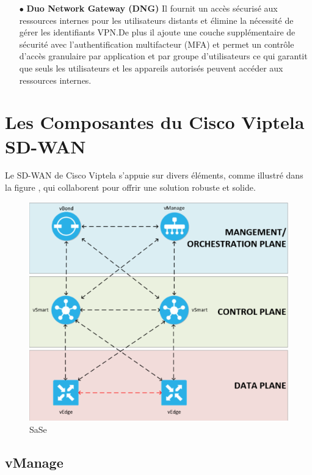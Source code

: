 \begin{itemize}
	\item[$\bullet$]\textbf{ Duo Network Gateway (DNG)} 
	Il fournit un accès sécurisé aux ressources internes pour les utilisateurs distants et élimine la nécessité de gérer les identifiants VPN.De plus il ajoute une couche supplémentaire de sécurité avec l'authentification multifacteur (MFA) et permet un contrôle d'accès granulaire par application et par groupe d'utilisateurs ce qui garantit que seuls les utilisateurs et les appareils autorisés peuvent accéder aux ressources internes.
\end{itemize}
\section{Les Composantes du Cisco Viptela SD-WAN  }

Le SD-WAN de Cisco Viptela s'appuie sur divers éléments, comme illustré dans la figure , qui collaborent pour offrir une solution robuste et solide.
\begin{figure} [H]
	\begin{center}
		\centering
		\hspace*{-0.5cm}
	\includegraphics{../image/composantes}
	\end{center}
	\caption{SaSe}
\end{figure} 


\subsection{vManage}

